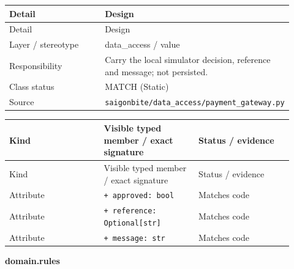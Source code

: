 \begin{longtable}{>{\raggedright\arraybackslash}p{0.4600\linewidth}>{\raggedright\arraybackslash}p{0.4600\linewidth}}
Detail & Design \\
\hline\endfirsthead
Detail & Design \\
\hline\endhead
Layer / stereotype & data\_access / \guillemotleft{}value\guillemotright{} \\
Responsibility & Carry the local simulator decision, reference and message; not persisted. \\
Class status & MATCH (Static) \\
Source & \texttt{saigonbite/\allowbreak{}data\_\allowbreak{}access/\allowbreak{}payment\_\allowbreak{}gateway.\allowbreak{}py} \\
\end{longtable}
\begin{longtable}{>{\raggedright\arraybackslash}p{0.3067\linewidth}>{\raggedright\arraybackslash}p{0.3067\linewidth}>{\raggedright\arraybackslash}p{0.3067\linewidth}}
Kind & Visible typed member / exact signature & Status / evidence \\
\hline\endfirsthead
Kind & Visible typed member / exact signature & Status / evidence \\
\hline\endhead
Attribute & \texttt{+ approved: bool} & Matches code \\
Attribute & \texttt{+ reference: Optional[str]} & Matches code \\
Attribute & \texttt{+ message: str} & Matches code \\
\end{longtable}
\textbf{domain.rules}

